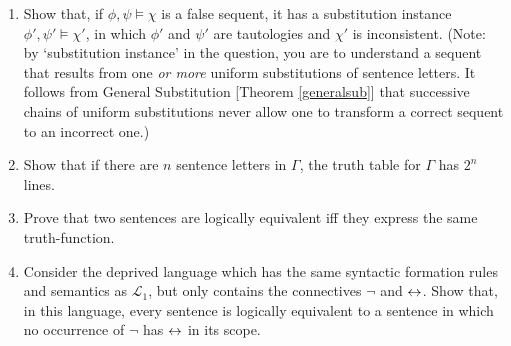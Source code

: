 {\begin{enumerate}
\item Show that, if $\phi,\psi \vDash \chi$ is a false sequent,
it has a substitution instance $\phi',\psi' \vDash \chi'$, in which 
$\phi'$ and $\psi'$ are tautologies and $\chi'$ is
inconsistent. (Note: by `substitution instance' in the question, you are to understand a sequent that results from one \emph{or more} uniform substitutions of sentence letters. It follows from General Substitution [Theorem \ref{generalsub}] that successive chains of uniform substitutions never allow one to transform a correct sequent to an incorrect one.)

\item  Show that if there are $n$ sentence letters in $\Gamma$, the truth table for $\Gamma$ has $2^{n}$ lines.

\item Prove that two sentences are logically equivalent iff they express the same truth-function.

\item Consider the deprived language which has the same syntactic formation rules and semantics as $\mathcal{L}_{1}$, but only contains the connectives $\neg$ and $\leftrightarrow$. Show that, in this language, every sentence is logically equivalent to a sentence in which no occurrence of $\neg$ has $\leftrightarrow$ in its scope.
\end{enumerate}

}